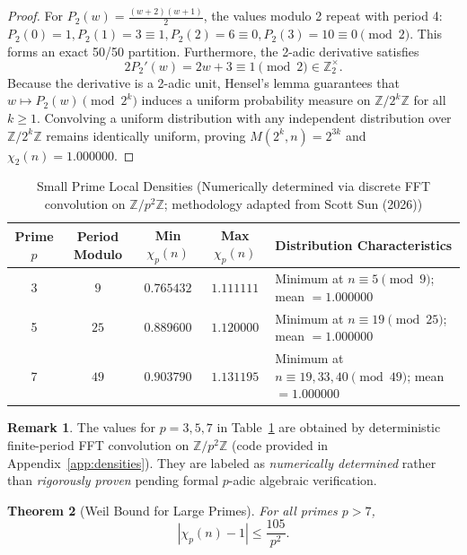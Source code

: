 \documentclass[11pt, a4paper]{article}
\theoremstyle{plain}
\newtheorem{theorem}{Theorem}[section]
\theoremstyle{definition}
\newtheorem{remark}[theorem]{Remark}
\begin{document}
\begin{proof}
For $P_2(w) = \frac{(w+2)(w+1)}{2}$, the values modulo 2 repeat with period 4: $P_2(0)=1, P_2(1)=3\equiv 1, P_2(2)=6\equiv 0, P_2(3)=10\equiv 0 \pmod 2$. This forms an exact 50/50 partition. Furthermore, the 2-adic derivative satisfies
\[
2 P_2'(w) = 2w + 3 \equiv 1 \pmod 2 \in \mathbb{Z}_2^\times.
\]
Because the derivative is a 2-adic unit, Hensel's lemma guarantees that $w \mapsto P_2(w) \pmod{2^k}$ induces a uniform probability measure on $\mathbb{Z}/2^k\mathbb{Z}$ for all $k \geq 1$. Convolving a uniform distribution with any independent distribution over $\mathbb{Z}/2^k\mathbb{Z}$ remains identically uniform, proving $M(2^k, n) = 2^{3k}$ and $\chi_2(n) = 1.000000$.
\end{proof}

\begin{table}[htbp]
\centering
\caption{Small Prime Local Densities (Numerically determined via discrete FFT convolution on $\mathbb{Z}/p^2\mathbb{Z}$; methodology adapted from Scott Sun (2026))}
\label{tab:smallprime}
\begin{tabular}{@{}ccccp{6.5cm}@{}}
\toprule
Prime $p$ & Period Modulo & Min $\chi_p(n)$ & Max $\chi_p(n)$ & Distribution Characteristics \\
\midrule
3 & $9$ & $0.765432$ & $1.111111$ & Minimum at $n \equiv 5 \pmod 9$; mean $= 1.000000$ \\
5 & $25$ & $0.889600$ & $1.120000$ & Minimum at $n \equiv 19 \pmod{25}$; mean $= 1.000000$ \\
7 & $49$ & $0.903790$ & $1.131195$ & Minimum at $n \equiv 19,33,40 \pmod{49}$; mean $= 1.000000$ \\
\bottomrule
\end{tabular}
\end{table}

\begin{remark}
The values for $p=3,5,7$ in Table~\ref{tab:smallprime} are obtained by deterministic finite-period FFT convolution on $\mathbb{Z}/p^2\mathbb{Z}$ (code provided in Appendix~\ref{app:densities}). They are labeled as \emph{numerically determined} rather than \emph{rigorously proven} pending formal $p$-adic algebraic verification.
\end{remark}

\begin{theorem}[Weil Bound for Large Primes]\label{thm:weil_tail}
For all primes $p > 7$,
\begin{equation}
|\chi_p(n) - 1| \leq \frac{105}{p^{2}}.
\end{equation}
\end{theorem}
\end{document}
